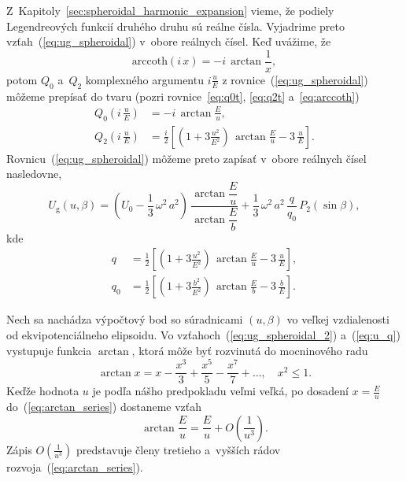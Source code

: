 \documentclass[a4paper,12pt]{book}
\newcommand{\gidx}{\mathrm g}
\begin{document}
Z~Kapitoly~\ref{sec:spheroidal_harmonic_expansion} vieme, že podiely 
Legendreových funkcií druhého druhu sú reálne čísla.  Vyjadrime preto 
vzťah~(\ref{eq:ug_spheroidal}) v~obore reálnych čísel.  Keď uvážime, že 
\parencite{MoritzTheFigureOfTheEarth}
%
\begin{equation}
\mathrm{arccoth} (i \, x) = -i \, \arctan\frac{1}{x}{,}
\end{equation}
%
potom $Q_0$ a~$Q_2$ komplexného argumentu $i \frac{u}{E}$ 
z rovnice~(\ref{eq:ug_spheroidal}) môžeme prepísať do tvaru (pozri 
rovnice~\ref{eq:q0t}, \ref{eq:q2t} a~\ref{eq:arccoth})
%
\begin{align}
Q_0\left( i \, \frac{u}{E} \right) &= -i \, \arctan\frac{E}{u}{,}\\
%
Q_2\left( i \, \frac{u}{E} \right) &= \frac{i}{2} \left[ \left( 
1 + 3 \frac{u^2}{E^2} \right) \, \arctan\frac{E}{u} - 3 \, \frac{u}{E} 
\right]{.}
\end{align}
%
Rovnicu~(\ref{eq:ug_spheroidal}) môžeme preto zapísať v~obore reálnych čísel 
nasledovne,
%
\begin{equation}
\label{eq:ug_spheroidal_2}
U_\gidx(u, \beta) = \left( U_0 - \frac{1}{3} \, \omega^2 \, a^2 \right) \, 
\frac{\arctan\dfrac{E}{u}}{\arctan\dfrac{E}{b}} + \frac{1}{3} \, \omega^2 \, 
a^2 \, \frac{q}{q_0} \, P_2(\sin\beta){,}
\end{equation}
%
kde
%
\begin{align}
\label{eq:u_q}
q &= \frac{1}{2} \left[ \left( 1 + 3 \frac{u^2}{E^2} \right) \, 
\arctan\frac{E}{u} - 3 \, \frac{u}{E} \right]{,}\\
%
q_0 &= \frac{1}{2} \left[ \left( 1 + 3 \frac{b^2}{E^2} \right) \, 
\arctan\frac{E}{b} - 3 \, \frac{b}{E} \right]{.}
\end{align}

Nech sa nachádza výpočtový bod so súradnicami $(u, \beta)$ vo veľkej 
vzdialenosti od ekvipotenciálneho elipsoidu.  Vo 
vzťahoch~(\ref{eq:ug_spheroidal_2}) a~(\ref{eq:u_q}) vystupuje funkcia 
$\arctan$, ktorá môže byť rozvinutá do mocninového radu 
\parencite{Gradshteyn2007}
%
\begin{equation}
\label{eq:arctan_series}
\arctan x = x - \frac{x^3}{3} + \frac{x^5}{5} - \frac{x^7}{7} + \dots{,} \quad 
x^2 \leq 1{.}
\end{equation}
%
Keďže hodnota $u$ je podľa nášho predpokladu veľmi veľká, po dosadení $x 
= \frac{E}{u}$ do~(\ref{eq:arctan_series}) dostaneme vzťah
%
\begin{equation}
\label{eq:eu_atan}
\arctan\frac{E}{u} = \frac{E}{u} + O\left( \frac{1}{u^3} \right){.}
\end{equation}
%
Zápis $O\left( \frac{1}{u^3} \right)$ predstavuje členy tretieho a~vyšších 
rádov rozvoja~(\ref{eq:arctan_series}).
\end{document}
